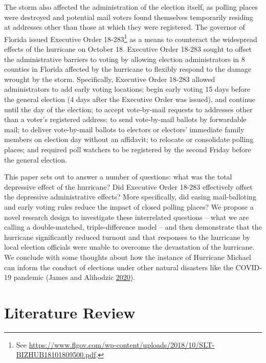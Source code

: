 \documentclass[
  12pt,
]{article}
\begin{document}
The storm also affected the administration of the election itself, as polling places were destroyed and potential mail voters found themselves temporarily residing at addresses other than those at which they were registered. The governor of Florida issued Executive Order 18-283\footnote{See \url{https://www.flgov.com/wp-content/uploads/2018/10/SLT-BIZHUB18101809500.pdf}.} as a means to counteract the widespread effects of the hurricane on October 18. Executive Order 18-283 sought to offset the administrative barriers to voting by allowing election administrators in 8 counties in Florida affected by the hurricane to flexibly respond to the damage wrought by the storm. Specifically, Executive Order 18-283 allowed administrators to add early voting locations; begin early voting 15 days before the general election (4 days after the Executive Order was issued), and continue until the day of the election; to accept vote-by-mail requests to addresses other than a voter's registered address; to send vote-by-mail ballots by forwardable mail; to deliver vote-by-mail ballots to electors or electors' immediate family members on election day without an affidavit; to relocate or consolidate polling places; and required poll watchers to be registered by the second Friday before the general election.

This paper sets out to answer a number of questions: what was the total depressive effect of the hurricane? Did Executive Order 18-283 effectively offset the depressive administrative effects? More specifically, did easing mail-balloting and early voting rules reduce the impact of closed polling places? We propose a novel research design to investigate these interrelated questions -- what we are calling a double-matched, triple-difference model -- and then demonstrate that the hurricane significantly reduced turnout and that responses to the hurricane by local election officials were unable to overcome the devastation of the hurricane. We conclude with some thoughts about how the instance of Hurricane Michael can inform the conduct of elections under other natural disasters like the COVID-19 pandemic (James and Alihodzic \protect\hyperlink{ref-James2020}{2020}).

\hypertarget{literature-review}{%
\section*{Literature Review}\label{literature-review}}
\end{document}
